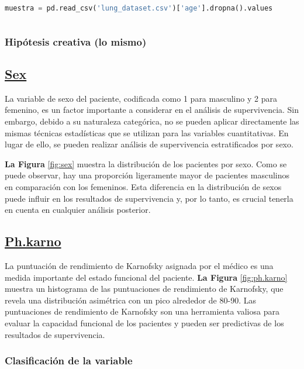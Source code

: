 \documentclass[a4paper,12pt]{article}
\begin{document}
    \begin{lstlisting}[language=Python, caption={Código en Python para calcular el intervalo de confianza}]
muestra = pd.read_csv('lung_dataset.csv')['age'].dropna().values
    
    \end{lstlisting}

    \subsubsection*{Hipótesis creativa (lo mismo)}

    \subsection*{\underline{Sex}}

    La variable de sexo del paciente, codificada como 1 para masculino y 2 para femenino, es un factor importante a considerar en el análisis de supervivencia. Sin embargo, debido a su naturaleza categórica, no se pueden aplicar directamente las mismas técnicas estadísticas que se utilizan para las variables cuantitativas. En lugar de ello, se pueden realizar análisis de supervivencia estratificados por sexo.
    
    \textbf{La Figura }\ref{fig:sex} muestra la distribución de los pacientes por sexo. Como se puede observar, hay una proporción ligeramente mayor de pacientes masculinos en comparación con los femeninos. Esta diferencia en la distribución de sexos puede influir en los resultados de supervivencia y, por lo tanto, es crucial tenerla en cuenta en cualquier análisis posterior.

    \subsection*{\underline{Ph.karno}}

    La puntuación de rendimiento de Karnofsky asignada por el médico es una medida importante del estado funcional del paciente. \textbf{La Figura }\ref{fig:ph.karno} muestra un histograma de las puntuaciones de rendimiento de Karnofsky, que revela una distribución asimétrica con un pico alrededor de 80-90. Las puntuaciones de rendimiento de Karnofsky son una herramienta valiosa para evaluar la capacidad funcional de los pacientes y pueden ser predictivas de los resultados de supervivencia.

    \subsubsection*{Clasificación de la variable}
\end{document}
